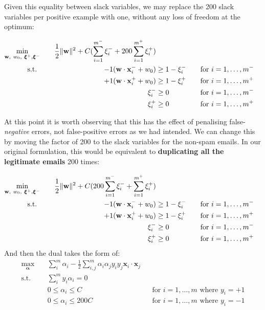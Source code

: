 Given this equality between slack variables, we may replace the 200 slack variables per positive example with one, without any loss of freedom at the optimum:

\begin{alignat*}{3}
  \min_{\mathbf{w},~w_0,~\boldsymbol\xi^+,\boldsymbol\xi^-}\quad&&\frac{1}{2}\lVert\mathbf{w}\rVert^2 + C(\sum_{i=1}^{m^-}\xi_i^-+200\sum_{i=1}^{m^+}\xi_i^+)\\
  \text{s.t. }\quad&&-1(\mathbf{w}\cdot\mathbf{x}_i^-+w_0) & \geq 1 - \xi_i^- &&\quad\text{for }i = 1,\ldots,m^-
  \\ &&+1(\mathbf{w}\cdot\mathbf{x}_i^++w_0) & \geq 1 - \xi_i^+ &&\quad\text{for }i = 1,\ldots,m^+
  \\ &&\xi_i^- & \geq 0 &&\quad\text{for }i=1,\ldots,m^-
  \\ &&\xi_i^+ & \geq 0 &&\quad\text{for }i=1,\ldots,m^+
\end{alignat*}

At this point it is worth observing that this has the effect of penalising false-\textit{negative} errors, not false-positive errors as we had intended. We can change this by moving the factor of 200 to the slack variables for the non-spam emails. In our original formulation, this would be equivalent to \textbf{duplicating all the legitimate emails} 200 times:

\begin{alignat*}{3}
  \min_{\mathbf{w},~w_0,~\boldsymbol\xi^+,\boldsymbol\xi^-}\quad&&\frac{1}{2}\lVert\mathbf{w}\rVert^2 + C(200\sum_{i=1}^{m^-}\xi_i^-+\sum_{i=1}^{m^+}\xi_i^+)\\
  \text{s.t. }\quad&&-1(\mathbf{w}\cdot\mathbf{x}_i^-+w_0) & \geq 1 - \xi_i^- &&\quad\text{for }i = 1,\ldots,m^-
  \\ &&+1(\mathbf{w}\cdot\mathbf{x}_i^++w_0) & \geq 1 - \xi_i^+ &&\quad\text{for }i = 1,\ldots,m^+
  \\ &&\xi_i^- & \geq 0 &&\quad\text{for }i=1,\ldots,m^-
  \\ &&\xi_i^+ & \geq 0 &&\quad\text{for }i=1,\ldots,m^+
\end{alignat*}
\noindent And then the dual takes the form of:
\begin{align*}
  \max_{\boldsymbol\alpha}\quad&\sum_{i}^m\alpha_i-\frac{1}{2}\sum_{i,j}^{m}\alpha_i\alpha_jy_iy_j\mathbf{x}_i\cdot\mathbf{x}_j\\
  \text{s.t.}\quad&\sum_i^my_i\alpha_i = 0
  \\ & 0\leq\alpha_i\leq C && \text{for }i=1,\ldots,m\text{ where }y_i=+1
  \\ & 0\leq\alpha_i\leq 200C &&\text{for }i=1,\ldots,m\text{ where }y_i=-1
\end{align*}

